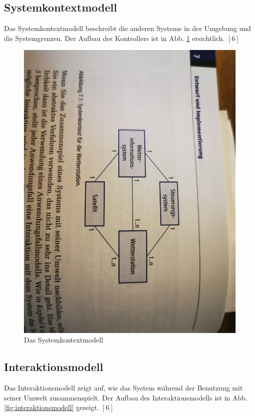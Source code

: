 \subsection{Systemkontextmodell}
Das Systemkontextmodell beschreibt die anderen Systeme in der Umgebung und die Systemgrenzen. Der Aufbau des Kontrollers ist in Abb. \ref{fig:systemkontextmodell} ersichtlich. $[6]$


\begin{figure}[H]
    \centering
    \includegraphics[scale=0.09, angle=90]{98_images/systemkontextmodell.jpg}
    \caption{Das Systemkontextmodell}
    \label{fig:systemkontextmodell}
\end{figure}

\subsection{Interaktionsmodell}
Das Interaktionsmodell zeigt auf, wie das System während der Benutzung mit seiner Umwelt zusammenspielt. Der Aufbau des Interaktionsmodells ist in Abb. \ref{fig:interaktionsmodell} gezeigt. $[6]$

